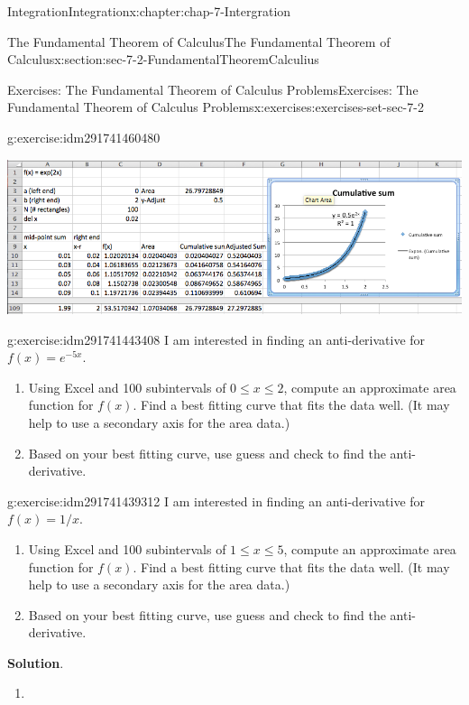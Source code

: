 \documentclass[oneside,10pt,]{book}
\numberwithin{equation}{section}
\begin{document}
\begin{chapterptx}{Integration}{}{Integration}{}{}{x:chapter:chap-7-Intergration}
\begin{sectionptx}{The Fundamental Theorem of Calculus}{}{The Fundamental Theorem of Calculus}{}{}{x:section:sec-7-2-FundamentalTheoremCalculius}
\begin{exercises-subsection}{Exercises: The Fundamental Theorem of Calculus Problems}{}{Exercises: The Fundamental Theorem of Calculus Problems}{}{}{x:exercises:exercises-set-sec-7-2}
\begin{divisionexercise}{9}{}{}{g:exercise:idm291741460480}
\begin{enumerate}[label=(\alph*)]
\begin{sidebyside}{1}{0}{0}{0}
\begin{sbspanel}{1}
\includegraphics[width=\linewidth]{images/sec7-2-sol9b.png}
\end{sbspanel}%
\end{sidebyside}%
\end{enumerate}
\end{divisionexercise}%
\begin{divisionexercise}{10}{}{}{g:exercise:idm291741443408}%
I am interested in finding an anti-derivative for \(f(x)=e^{-5x}\).%
%
\begin{enumerate}[label=(\alph*)]
\item{}Using Excel and 100 subintervals of \(0 \le  x \le  2\), compute an approximate area function for \(f(x)\).  Find a best fitting curve that fits the data well.  (It may help to use a secondary axis for the area data.)%
\item{}Based on your best fitting curve, use guess and check to find the anti-derivative.%
\end{enumerate}
\end{divisionexercise}%
\begin{divisionexercise}{11}{}{}{g:exercise:idm291741439312}%
I am interested in finding an anti-derivative for \(f(x)=1/x\).%
%
\begin{enumerate}[label=(\alph*)]
\item{}Using Excel and 100 subintervals of \(1 \le  x \le  5\), compute an approximate area function for \(f(x)\).  Find a best fitting curve that fits the data well.  (It may help to use a secondary axis for the area data.)%
\item{}Based on your best fitting curve, use guess and check to find the anti-derivative.%
\end{enumerate}
\par\smallskip%
\noindent\textbf{Solution}.\hypertarget{g:solution:idm291741435360}{}\quad{}%
\begin{enumerate}[label=(\alph*)]
\item{}\begin{sidebyside}{1}{0}{0}{0}%
\begin{sbspanel}{1}%

\end{sbspanel}
\end{sidebyside}
\end{enumerate}
\end{divisionexercise}
\end{exercises-subsection}
\end{sectionptx}
\end{chapterptx}
\end{document}
